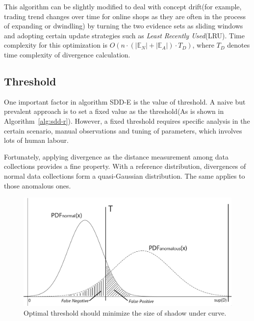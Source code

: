 \documentclass{article}
\begin{document}
			This algorithm can be slightly modified to deal with concept drift(for example, trading trend changes over time for online shops as they are often in the process of expanding or dwindling) by turning the two evidence sets as sliding windows and adopting certain update strategies such as \textit{Least Recently Used}(LRU). Time complexity for this optimization is $O(n\cdot(|\mathbb{E}_N|+|\mathbb{E}_A|)\cdot T_D)$, where $T_D$ denotes time complexity of divergence calculation.
	
		\subsection{Threshold}\label{sec:alg-threshold}
			One important factor in algorithm SDD-E is the value of threshold.
			A naive but prevalent approach is to set a fixed value as the threshold(As is shown in Algorithm~\ref{alg:sdd-r}).
			However, a fixed threshold requires specific analysis in the certain scenario, manual observations and tuning of parameters, which involves lots of human labour.
			
			Fortunately, applying divergence as the distance measurement among data collections provides a fine property. With a reference distribution, divergences of normal data collections form a quasi-Gaussian distribution. The same applies to those anomalous ones.
	
			\begin{figure}[!t]
				\centering
				\includegraphics[width=\linewidth]{fig/ExampleThreshold.png}
				\caption{Optimal threshold should minimize the size of shadow under curve.}
				\label{fig:example-threshold}
			\end{figure}
	
\end{document}
